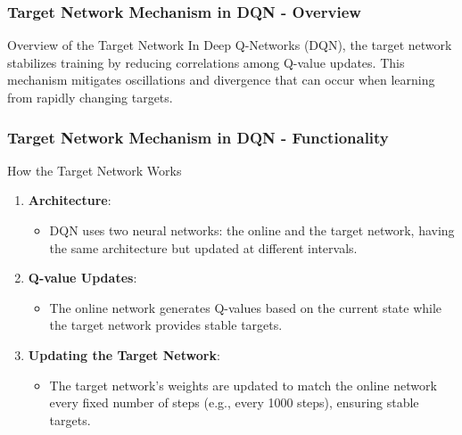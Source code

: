 \documentclass{beamer}
\begin{document}
\begin{frame}[fragile]
    \frametitle{Target Network Mechanism in DQN - Overview}
    \begin{block}{Overview of the Target Network}
        In Deep Q-Networks (DQN), the target network stabilizes training by reducing correlations among Q-value updates. 
        This mechanism mitigates oscillations and divergence that can occur when learning from rapidly changing targets.
    \end{block}
\end{frame}

\begin{frame}[fragile]
    \frametitle{Target Network Mechanism in DQN - Functionality}
    \begin{block}{How the Target Network Works}
        \begin{enumerate}
            \item \textbf{Architecture}: 
                \begin{itemize}
                    \item DQN uses two neural networks: the online and the target network, having the same architecture but updated at different intervals.
                \end{itemize}
            \item \textbf{Q-value Updates}:
                \begin{itemize}
                    \item The online network generates Q-values based on the current state while the target network provides stable targets.
                \end{itemize}
            \item \textbf{Updating the Target Network}:
                \begin{itemize}
                    \item The target network's weights are updated to match the online network every fixed number of steps (e.g., every 1000 steps), ensuring stable targets.
                \end{itemize}
        \end{enumerate}
    \end{block}
\end{frame}
\end{document}
